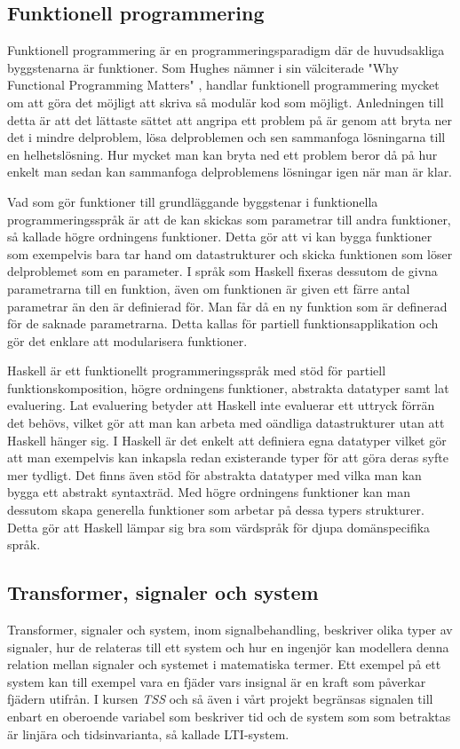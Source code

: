 \documentclass[]{article}
\begin{document}
\subsection{Funktionell programmering}
Funktionell programmering är en programmeringsparadigm där de huvudsakliga
byggstenarna är funktioner.
Som Hughes nämner i sin välciterade "Why Functional Programming Matters"
\cite{hughes1989functional}, handlar funktionell programmering mycket om att göra det
möjligt att skriva så modulär kod som möjligt.
Anledningen till detta är att det lättaste sättet att angripa ett problem på är
genom att bryta ner det i mindre delproblem, lösa delproblemen och sen
sammanfoga lösningarna till en helhetslösning.
Hur mycket man kan bryta ned ett problem beror då på hur enkelt man sedan kan
sammanfoga delproblemens lösningar igen när man är klar.

Vad som gör funktioner till grundläggande byggstenar i funktionella
programmeringsspråk är att de kan skickas som parametrar till andra funktioner,
så kallade högre ordningens funktioner.
Detta gör att vi kan bygga funktioner som exempelvis bara tar hand om
datastrukturer och skicka funktionen som löser delproblemet som en parameter.
I språk som Haskell fixeras dessutom de givna parametrarna till en funktion,
även om funktionen är given ett färre antal parametrar än den är definierad för. Man får då en ny funktion som är definerad för de saknade parametrarna. 
Detta kallas för partiell funktionsapplikation och gör det enklare att modularisera funktioner.

Haskell är ett funktionellt programmeringsspråk med stöd för partiell funktionskomposition,
högre ordningens funktioner, abstrakta datatyper samt lat evaluering.
Lat evaluering betyder att Haskell inte evaluerar ett uttryck förrän det behövs, vilket gör att man kan arbeta med oändliga datastrukturer utan att Haskell hänger sig.
I Haskell är det enkelt att definiera egna datatyper vilket gör att man exempelvis kan inkapsla redan existerande typer för att göra deras syfte mer tydligt. Det finns även stöd för abstrakta datatyper med vilka man kan bygga ett abstrakt syntaxträd. Med högre ordningens funktioner kan man dessutom skapa generella funktioner som arbetar på dessa typers strukturer. Detta gör att Haskell lämpar sig bra som värdspråk för djupa domänspecifika språk.

\subsection{Transformer, signaler och system}
Transformer, signaler och system, inom signalbehandling, beskriver olika typer av signaler, hur de relateras till ett
system och hur en ingenjör kan modellera denna relation mellan signaler och systemet i matematiska termer. Ett exempel
på ett system kan till exempel vara en fjäder vars insignal är en kraft som påverkar fjädern utifrån. I kursen
\textit{TSS} och så även i vårt projekt begränsas signalen till enbart en oberoende variabel som beskriver tid och de
system som som betraktas är linjära och tidsinvarianta, så kallade  LTI-system.
\end{document}
